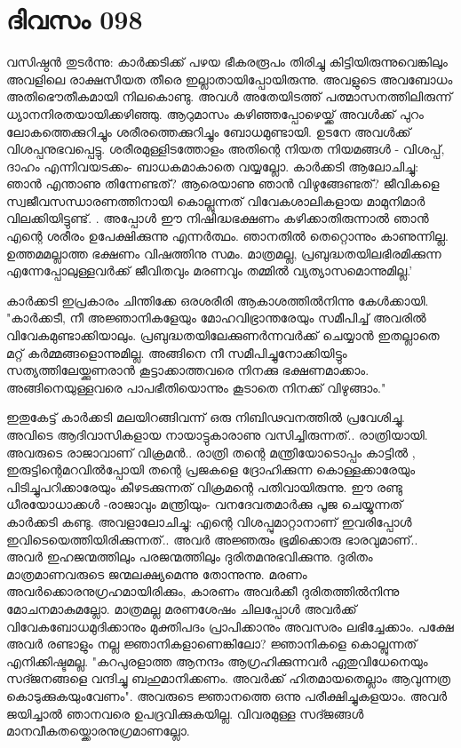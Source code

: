  
\section{ദിവസം 098}


വസിഷ്ഠന്‍ തുടര്‍ന്നു: കാര്‍ക്കടിക്ക്‌ പഴയ ഭീകരരൂപം തിരിച്ചു കിട്ടിയിരുന്നുവെങ്കിലും അവളിലെ രാക്ഷസീയത തീരെ ഇല്ലാതായിപ്പോയിരുന്നു. അവളുടെ അവബോധം അതിഭൌതീകമായി നിലകൊണ്ടു. അവള്‍ അതേയിടത്ത്‌ പത്മാസനത്തിലിരുന്ന് ധ്യാനനിരതയായിക്കഴിഞ്ഞു. ആറുമാസം കഴിഞ്ഞപ്പോഴെയ്ക്ക്‌ അവള്‍ക്ക്‌ പുറം ലോകത്തെക്കുറിച്ചും ശരീരത്തെക്കുറിച്ചും ബോധമുണ്ടായി. ഉടനേ അവള്‍ക്ക്‌ വിശപ്പനുഭവപ്പെട്ടു. ശരീരമുള്ളിടത്തോളം അതിന്റെ നിയത നിയമങ്ങള്‍ - വിശപ്പ്‌, ദാഹം എന്നിവയടക്കം- ബാധകമാകാതെ വയ്യല്ലോ. കാര്‍ക്കടി ആലോചിച്ചു: ഞാന്‍ എന്താണു തിന്നേണ്ടത്‌? ആരെയാണു ഞാന്‍ വിഴുങ്ങേണ്ടത്‌? ജീവികളെ സ്വജീവസന്ധാരണത്തിനായി കൊല്ലുന്നത്‌ വിവേകശാലികളായ മാമുനിമാര്‍ വിലക്കിയിട്ടുണ്ട്‌. . അപ്പോള്‍ ഈ നിഷിദ്ധഭക്ഷണം കഴിക്കാതിരുന്നാല്‍ ഞാന്‍ എന്റെ ശരീരം ഉപേക്ഷിക്കുന്നു എന്നര്‍ത്ഥം. ഞാനതില്‍ തെറ്റൊന്നും കാണുന്നില്ല. ഉത്തമമല്ലാത്ത ഭക്ഷണം വിഷത്തിനു സമം. മാത്രമല്ല, പ്രബുദ്ധതയിലഭിരമിക്കുന്ന എന്നേപ്പോലുള്ളവര്‍ക്ക്‌ ജീവിതവും മരണവും തമ്മില്‍ വ്യത്യാസമൊന്നുമില്ല.'

കാര്‍ക്കടി ഇപ്രകാരം ചിന്തിക്കേ ഒരശരീരി ആകാശത്തില്‍നിന്നു കേള്‍ക്കായി. "കാര്‍ക്കടീ, നീ അജ്ഞാനികളേയും മോഹവിഭ്രാന്തരേയും സമീപിച്ച്‌ അവരില്‍ വിവേകമുണ്ടാക്കിയാലും. പ്രബുദ്ധതയിലേക്കുണര്‍ന്നവര്‍ക്ക്‌ ചെയ്യാന്‍ ഇതല്ലാതെ മറ്റ്‌ കര്‍മ്മങ്ങളൊന്നുമില്ല. അങ്ങിനെ നീ സമീപിച്ചുനോക്കിയിട്ടും സത്യത്തിലേയ്ക്കുണരാന്‍ കൂട്ടാക്കാത്തവരെ നിനക്കു ഭക്ഷണമാക്കാം. അങ്ങിനെയുള്ളവരെ പാപഭീതിയൊന്നും കൂടാതെ നിനക്ക്‌ വിഴുങ്ങാം." 

ഇതുകേട്ട്‌ കാര്‍ക്കടി മലയിറങ്ങിവന്ന് ഒരു നിബിഢവനത്തില്‍ പ്രവേശിച്ചു. അവിടെ ആദിവാസികളായ നായാട്ടുകാരാണു വസിച്ചിരുന്നത്‌.. രാത്രിയായി. അവരുടെ രാജാവാണ്‌ വിക്രമന്‍.. രാത്രി തന്റെ മന്ത്രിയോടൊപ്പം കാട്ടില്‍ , ഇരുട്ടിന്റെമറവില്‍പ്പോയി തന്റെ പ്രജകളെ ദ്രോഹിക്കുന്ന കൊള്ളക്കാരേയും പിടിച്ചുപറിക്കാരേയും കീഴടക്കുന്നത്‌ വിക്രമന്റെ പതിവായിരുന്നു. ഈ രണ്ടു ധീരയോധാക്കള്‍ -രാജാവും മന്ത്രിയും- വനദേവതമാര്‍ക്കു പൂജ ചെയ്യുന്നത്‌ കാര്‍ക്കടി കണ്ടു. അവളാലോചിച്ചു: എന്റെ വിശപ്പുമാറ്റാനാണ്‌ ഇവരിപ്പോള്‍ ഇവിടെയെത്തിയിരിക്കുന്നത്‌.. അവര്‍ അജ്ഞരും ഭൂമിക്കൊരു ഭാരവുമാണ്‌.. അവര്‍ ഇഹജന്മത്തിലും പരജന്മത്തിലും ദുരിതമനുഭവിക്കുന്നു. ദുരിതം മാത്രമാണവരുടെ ജന്മലക്ഷ്യമെന്നു തോന്നുന്നു. മരണം അവര്‍ക്കൊരനുഗ്രഹമായിരിക്കും, കാരണം അവര്‍ക്കീ ദുരിതത്തില്‍നിന്നു മോചനമാകുമല്ലോ. മാത്രമല്ല മരണശേഷം ചിലപ്പോള്‍ അവര്‍ക്ക്‌ വിവേകബോധമുദിക്കാനും മുക്തിപദം പ്രാപിക്കാനും അവസരം ലഭിച്ചേക്കാം. പക്ഷേ അവര്‍ രണ്ടാളും നല്ല ജ്ഞാനികളാണെങ്കിലോ? ജ്ഞാനികളെ കൊല്ലുന്നത്‌ എനിക്കിഷ്ടമല്ല. "കറപുരളാത്ത ആനന്ദം ആഗ്രഹിക്കുന്നവര്‍ ഏതുവിധേനെയും സദ്ജനങ്ങളെ വന്ദിച്ചു ബഹുമാനിക്കണം. അവര്‍ക്ക്‌ ഹിതമായതെല്ലാം ആവുന്നത്ര കൊടുക്കുകയുംവേണം". അവരുടെ ജ്ഞാനത്തെ ഒന്നു പരീക്ഷിച്ചുകളയാം. അവര്‍ ജയിച്ചാല്‍ ഞാനവരെ ഉപദ്രവിക്കുകയില്ല. വിവരമുള്ള സദ്ജങ്ങള്‍ മാനവീകതയ്ക്കൊരനുഗ്രമാണല്ലോ.

